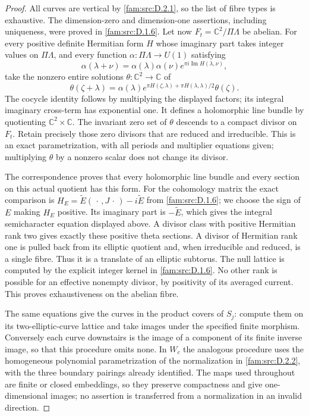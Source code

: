 \begin{proof}
\label{app:rederive:fam-src-D.2.3}
All curves are vertical by \ref{fam:src:D.2.1}, so the list of fibre types is exhaustive.
The dimension-zero and dimension-one assertions, including uniqueness,
were proved in \ref{fam:src:D.1.6}. Let now $F_t=\mathbb C^2/\Pi\Lambda$ be abelian.
For every positive definite Hermitian form $H$ whose imaginary part takes
integer values on $\Pi\Lambda$, and every function
$\alpha:\Pi\Lambda\to U(1)$ satisfying
\[
 \alpha(\lambda+\nu)=\alpha(\lambda)\alpha(\nu)
                 e^{\pi i\operatorname{Im}H(\lambda,\nu)},
\]
take the nonzero entire solutions $\theta:\mathbb C^2\to\mathbb C$ of
\begin{equation}\label{fam:eq:cd-theta-sections}
 \theta(\zeta+\lambda)=\alpha(\lambda)
 e^{\pi H(\zeta,\lambda)+\pi H(\lambda,\lambda)/2}\theta(\zeta).
\end{equation}
The cocycle identity follows by multiplying the displayed factors; its
integral imaginary cross-term has exponential one. It defines a
holomorphic line bundle by quotienting $\mathbb C^2\times\mathbb C$.
The invariant zero set of $\theta$ descends to a compact divisor on
$F_t$. Retain precisely those zero divisors that are reduced and
irreducible. This is an exact parametrization, with all periods and
multiplier equations given; multiplying $\theta$ by a nonzero scalar
does not change its divisor.

The correspondence \cite[Theorem 4.1, p.~1, and equation (4.3), p.~2]{Schnell19} proves
that every holomorphic line bundle and every section on this actual
quotient has this form. For the cohomology matrix the exact comparison is
$H_E=\widetilde E(\,\cdot\,,J\,\cdot\,)-i\widetilde E$ from \ref{fam:src:D.1.6};
we choose the sign of $E$ making $H_E$ positive. Its imaginary part is
$-\widetilde E$, which gives the integral semicharacter equation displayed
above. A divisor class with positive Hermitian rank two gives exactly
these positive theta sections. A divisor of Hermitian rank one is pulled
back from its elliptic quotient and, when irreducible and reduced, is a
single fibre. Thus it is a translate of an elliptic subtorus. The null
lattice is computed by the explicit integer kernel in \ref{fam:src:D.1.6}. No other
rank is possible for an effective nonempty divisor, by positivity of its
averaged current. This proves exhaustiveness on the abelian fibre.

The same equations give the curves in the product covers of $S_j$:
compute them on its two-elliptic-curve lattice and take images under the
specified finite morphism. Conversely each curve downstairs is the image
of a component of its finite inverse image, so that this procedure omits
none. In $W_c$ the analogous procedure uses the homogeneous polynomial
parametrization of the normalization in \ref{fam:src:D.2.2}, with the three boundary
pairings already identified. The maps used throughout are finite or
closed embeddings, so they preserve compactness and give one-dimensional
images; no assertion is transferred from a normalization in an invalid
direction.
\end{proof}
